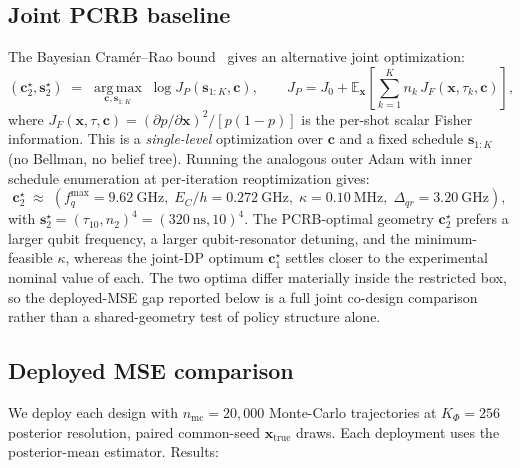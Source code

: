 \documentclass[11pt,a4paper,onecolumn]{article}
\newcommand{\E}{\mathbb{E}}
\newcommand{\argmax}{\operatorname*{arg\,max}}
\newcommand{\bx}{\bm{x}}
\newcommand{\bc}{\bm{c}}
\newcommand{\bs}{\bm{s}}
\begin{document}
\subsection{Joint PCRB baseline}

The Bayesian Cram\'er--Rao bound~\cite{vantrees2007bayesian, tichavsky1998posterior} gives an alternative joint optimization:
\begin{equation}
(\bc^\star_2, \bs^\star_2) \;=\; \argmax_{\bc, \bs_{1:K}}\; \log J_P(\bs_{1:K}, \bc),
\qquad
J_P = J_0 + \E_{\bx}\!\left[\textstyle\sum_{k=1}^K n_k\, J_F(\bx, \tau_k, \bc)\right],
\end{equation}
where $J_F(\bx, \tau, \bc) = (\partial p/\partial\bx)^2 / [p(1-p)]$ is the per-shot scalar Fisher information.  This is a \emph{single-level} optimization over $\bc$ and a fixed schedule $\bs_{1:K}$ (no Bellman, no belief tree).  Running the analogous outer Adam with inner schedule enumeration at per-iteration reoptimization gives:
\begin{equation}
\bc^\star_2 \;\approx\; (f_q^{\max} = 9.62~\mathrm{GHz},\; E_C/h = 0.272~\mathrm{GHz},\; \kappa = 0.10~\mathrm{MHz},\; \Delta_{qr} = 3.20~\mathrm{GHz}),
\end{equation}
with $\bs^\star_2 = (\tau_{10}, n_2)^4 = (320~\mathrm{ns}, 10)^4$.  The PCRB-optimal geometry $\bc^\star_2$ prefers a larger qubit frequency, a larger qubit-resonator detuning, and the minimum-feasible $\kappa$, whereas the joint-DP optimum $\bc^\star_1$ settles closer to the experimental nominal value of each.  The two optima differ materially inside the restricted box, so the deployed-MSE gap reported below is a full joint co-design comparison rather than a shared-geometry test of policy structure alone.

\subsection{Deployed MSE comparison}

We deploy each design with $n_{\mathrm{mc}} = 20{,}000$ Monte-Carlo trajectories at $K_\Phi = 256$ posterior resolution, paired common-seed $\bx_{\text{true}}$ draws.  Each deployment uses the posterior-mean estimator.  Results:
\end{document}
